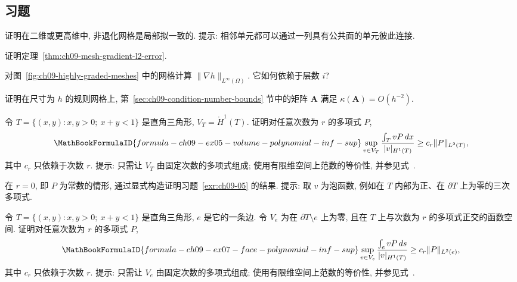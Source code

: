 \subsection{习题}
\label{sec:ch09-exercises}
\setcounter{exerciseitem}{0}

\begin{MBExercise}
\label{exr:ch09-01}
证明在二维或更高维中, 非退化网格是局部拟一致的. 提示: 相邻单元都可以通过一列具有公共面的单元彼此连接.
\end{MBExercise}

\begin{MBExercise}
\label{exr:ch09-02}
证明定理~\ref{thm:ch09-mesh-gradient-l2-error}.
\end{MBExercise}

\begin{MBExercise}
\label{exr:ch09-03}
对图~\ref{fig:ch09-highly-graded-meshes} 中的网格计算 $\|\nabla h\|_{L^\infty(\Omega)}$. 它如何依赖于层数 $i$?
\end{MBExercise}

\begin{MBExercise}
\label{exr:ch09-04}
证明在尺寸为 $h$ 的规则网格上, 第~\ref{sec:ch09-condition-number-bounds} 节中的矩阵 $\mathbf A$ 满足 $\kappa(\mathbf A)=O(h^{-2})$.
\end{MBExercise}

\begin{MBExercise}
\label{exr:ch09-05}
令 $T=\{(x,y):x,y>0;\ x+y<1\}$ 是直角三角形, $V_T=\mathring H^1(T)$. 证明对任意次数为 $r$ 的多项式 $P$,
\[
\MathBookFormulaID{formula-ch09-ex05-volume-polynomial-inf-sup}
\sup_{v\in V_T}\frac{\int_TvP\,dx}{|v|_{H^1(T)}}
\geq c_r\|P\|_{L^2(T)},
\]
其中 $c_r$ 只依赖于次数 $r$. 提示: 只需让 $V_T$ 由固定次数的多项式组成; 使用有限维空间上范数的等价性, 并参见式~.
\end{MBExercise}

\begin{MBExercise}
\label{exr:ch09-06}
在 $r=0$, 即 $P$ 为常数的情形, 通过显式构造证明习题~\ref{exr:ch09-05} 的结果. 提示: 取 $v$ 为泡函数, 例如在 $T$ 内部为正、在 $\partial T$ 上为零的三次多项式.
\end{MBExercise}

\begin{MBExercise}
\label{exr:ch09-07}
令 $T=\{(x,y):x,y>0;\ x+y<1\}$ 是直角三角形, $e$ 是它的一条边. 令 $V_e$ 为在 $\partial T\setminus e$ 上为零, 且在 $T$ 上与次数为 $r$ 的多项式正交的函数空间. 证明对任意次数为 $r$ 的多项式 $P$,
\[
\MathBookFormulaID{formula-ch09-ex07-face-polynomial-inf-sup}
\sup_{v\in V_e}\frac{\int_evP\,ds}{|v|_{H^1(T)}}
\geq c_r\|P\|_{L^2(e)},
\]
其中 $c_r$ 只依赖于次数 $r$. 提示: 只需让 $V_e$ 由固定次数的多项式组成; 使用有限维空间上范数的等价性, 并参见式~.
\end{MBExercise}

